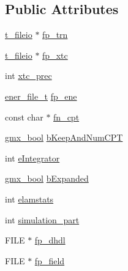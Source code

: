 \subsection*{\-Public \-Attributes}
\begin{DoxyCompactItemize}
\item 
\hyperlink{structt__fileio}{t\-\_\-fileio} $\ast$ \hyperlink{structgmx__mdoutf__t_ae9669907f38697942349c4bfb665e6db}{fp\-\_\-trn}
\item 
\hyperlink{structt__fileio}{t\-\_\-fileio} $\ast$ \hyperlink{structgmx__mdoutf__t_ad4462a94d7b04c1c9f81727fd5aff105}{fp\-\_\-xtc}
\item 
int \hyperlink{structgmx__mdoutf__t_af29479bb6c7d8179be6671cd9f439b2e}{xtc\-\_\-prec}
\item 
\hyperlink{include_2enxio_8h_a349ec360f67c80515a64c99c76d84c50}{ener\-\_\-file\-\_\-t} \hyperlink{structgmx__mdoutf__t_ac244b1f56ec6c88fbe760cef8c30866f}{fp\-\_\-ene}
\item 
const char $\ast$ \hyperlink{structgmx__mdoutf__t_a9db96fda36dbb260f55a05715da8e0d6}{fn\-\_\-cpt}
\item 
\hyperlink{include_2types_2simple_8h_a8fddad319f226e856400d190198d5151}{gmx\-\_\-bool} \hyperlink{structgmx__mdoutf__t_a89f9bfd3b22d12f54118fc6e916a6fac}{b\-Keep\-And\-Num\-C\-P\-T}
\item 
int \hyperlink{structgmx__mdoutf__t_afb7dfcbdc72da712d65adbf93f39fd75}{e\-Integrator}
\item 
\hyperlink{include_2types_2simple_8h_a8fddad319f226e856400d190198d5151}{gmx\-\_\-bool} \hyperlink{structgmx__mdoutf__t_a78baf61f1779aadfa9124de1356c2683}{b\-Expanded}
\item 
int \hyperlink{structgmx__mdoutf__t_a513516bed5ce1f58e84d7489789d2b05}{elamstats}
\item 
int \hyperlink{structgmx__mdoutf__t_afaf038c0c876959b77cc8fae2595868d}{simulation\-\_\-part}
\item 
\-F\-I\-L\-E $\ast$ \hyperlink{structgmx__mdoutf__t_a37d1453a364dd12774ba5b95639cf3ec}{fp\-\_\-dhdl}
\item 
\-F\-I\-L\-E $\ast$ \hyperlink{structgmx__mdoutf__t_a9ad30829208f330c8a08734e08219138}{fp\-\_\-field}
\end{DoxyCompactItemize}


